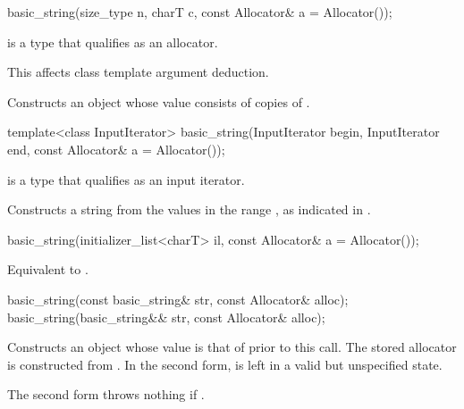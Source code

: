 %
\begin{itemdecl}
basic_string(size_type n, charT c, const Allocator& a = Allocator());
\end{itemdecl}

\begin{itemdescr}
\pnum
\constraints
{} is a type
that qualifies as an allocator.
\begin{note}
This affects class template argument deduction.
\end{note}

\pnum
\effects
Constructs an object whose value consists of  copies of .
\end{itemdescr}

%
\begin{itemdecl}
template<class InputIterator>
  basic_string(InputIterator begin, InputIterator end, const Allocator& a = Allocator());
\end{itemdecl}

\begin{itemdescr}
\pnum
\constraints
{} is a type that qualifies as an input
iterator.

\pnum
\effects
Constructs a string from the values in the range ,
as indicated in .
\end{itemdescr}

%
\begin{itemdecl}
basic_string(initializer_list<charT> il, const Allocator& a = Allocator());
\end{itemdecl}

\begin{itemdescr}
\pnum
\effects Equivalent to .
\end{itemdescr}

%
\begin{itemdecl}
basic_string(const basic_string& str, const Allocator& alloc);
basic_string(basic_string&& str, const Allocator& alloc);
\end{itemdecl}

\begin{itemdescr}
\pnum
\effects Constructs an object whose value is
that of  prior to this call.
The stored allocator is constructed from .
In the second form,  is left in a valid but unspecified state.

\pnum
\throws The second form throws nothing if .
\end{itemdescr}

